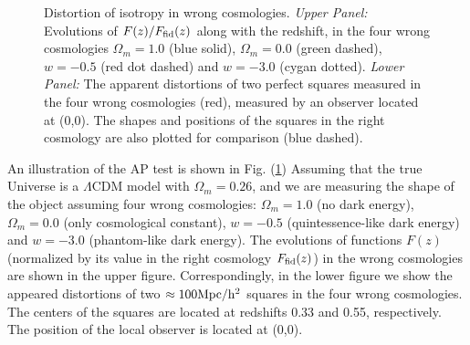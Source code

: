 \documentclass{emulateapj}
\begin{document}
\begin{figure}[tpb]
   \caption{\label{fig_AP} Distortion of isotropy in wrong cosmologies.
   {\it Upper Panel:} Evolutions of $F(z)/F_{\rm fid}(z)$ along with the redshift,
   in the four wrong cosmologies $\Omega_m=1.0$ (blue solid), $\Omega_m=0.0$ (green dashed), 
   $w=-0.5$ (red dot dashed) and $w=-3.0$ (cygan dotted).
   {\it Lower Panel:} The apparent distortions of two perfect squares measured in the four wrong cosmologies (red),
   measured by an observer located at (0,0).
   The shapes and positions of the squares in the right cosmology are also plotted for comparison (blue dashed).}
\end{figure}

An illustration of the AP test is shown in Fig. (\ref{fig_AP})
Assuming that the true Universe is a $\Lambda$CDM model with $\Omega_m=0.26$,
and we are measuring the shape of the object assuming four wrong cosmologies:
$\Omega_m=1.0$ (no dark energy), $\Omega_m=0.0$ (only cosmological constant), 
$w=-0.5$ (quintessence-like dark energy) and $w=-3.0$ (phantom-like dark energy).
The evolutions of functions $F(z)$ (normalized by its value in the right cosmology $F_{\rm fid}(z)$) 
in the wrong cosmologies are shown in the upper figure.
Correspondingly, in the lower figure we show the appeared distortions of two $\approx100 {\rm Mpc/h^2}$ squares in the four wrong cosmologies.
The centers of the squares are located at redshifts 0.33 and 0.55, respectively.
The position of the local observer is located at (0,0).
\end{document}
